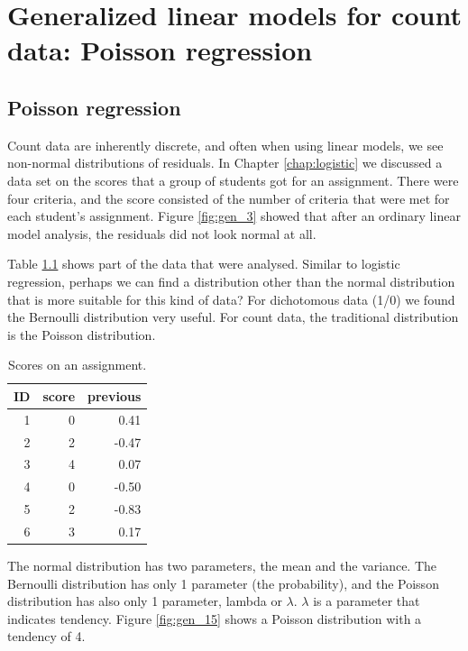 \documentclass[]{book}\usepackage[]{graphicx}\usepackage[]{color}
\begin{document}





\chapter{Generalized linear models for count data: Poisson regression}\label{chap:poisson}


\section{Poisson regression}


Count data are inherently discrete, and often when using linear models, we see non-normal distributions of residuals. In Chapter \ref{chap:logistic} we discussed a data set on the scores that a group of students got for an assignment. There were four criteria, and the score consisted of the number of criteria that were met for each student's assignment. Figure \ref{fig:gen_3} showed that after an ordinary linear model analysis, the residuals did not look normal at all.

Table \ref{tab:gen_14} shows part of the data that were analysed. Similar to logistic regression, perhaps we can find a distribution other than the normal distribution that is more suitable for this kind of data? For dichotomous data (1/0) we found the Bernoulli distribution very useful. For count data, the traditional distribution is the Poisson distribution.


\begin{table}[ht]
\centering
\caption{Scores on an assignment.} 
\label{tab:gen_14}
\begin{tabular}{rrr}
  \hline
ID & score & previous \\ 
  \hline
1 & 0 & 0.41 \\ 
  2 & 2 & -0.47 \\ 
  3 & 4 & 0.07 \\ 
  4 & 0 & -0.50 \\ 
  5 & 2 & -0.83 \\ 
  6 & 3 & 0.17 \\ 
   \hline
\end{tabular}
\end{table}


The normal distribution has two parameters, the mean and the variance. The Bernoulli distribution has only 1 parameter (the probability), and the Poisson distribution has also only 1 parameter, lambda or $\lambda$. $\lambda$ is a parameter that indicates tendency. Figure \ref{fig:gen_15} shows a Poisson distribution with a tendency of 4.
\end{document}
